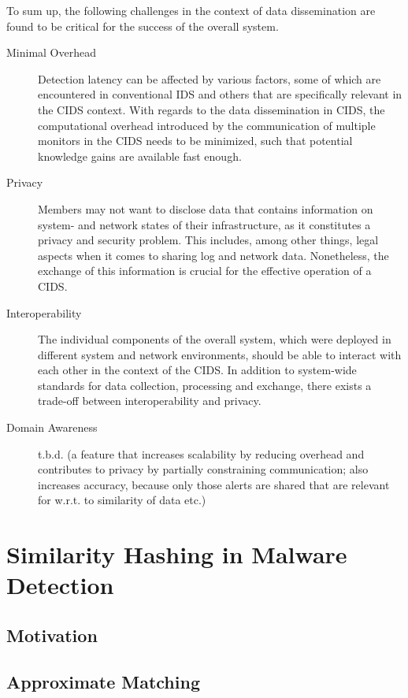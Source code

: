 To sum up, the following challenges in the context of data dissemination are found to be critical for the success of the overall system. 
\begin{description}

    \item[Minimal Overhead] Detection latency can be affected by various factors, some of which are encountered in conventional IDS and others that are specifically relevant in the CIDS context. With regards to the data dissemination in CIDS, the computational overhead introduced by the communication of multiple monitors in the CIDS needs to be minimized, such that potential knowledge gains are available fast enough.

    \item[Privacy] Members may not want to disclose data that contains information on system- and network states of their infrastructure, as it constitutes a privacy and security problem. This includes, among other things, legal aspects when it comes to sharing log and network data. Nonetheless, the exchange of this information is crucial for the effective operation of a CIDS.
    
    \item[Interoperability] The individual components of the overall system, which were deployed in different system and network environments, should be able to interact with each other in the context of the CIDS. In addition to system-wide standards for data collection, processing and exchange, there exists a trade-off between interoperability and privacy.
    
    \item[Domain Awareness] t.b.d. (a feature that increases scalability by reducing overhead and contributes to privacy by partially constraining communication; also increases accuracy, because only those alerts are shared that are relevant for w.r.t. to similarity of data etc.)

\end{description}

\section{Similarity Hashing in Malware Detection}

\subsection{Motivation}

\subsection{Approximate Matching}

